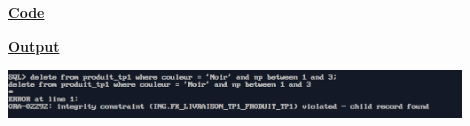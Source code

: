\newpage
{}

\textbf{\underline{Code}}


\vspace{1cm}
\textbf{\underline{Output}}
\vspace{1cm}
\begin{center}
    \includegraphics[width=0.9\textwidth]{Questions/q40/q40.png}
\end{center}


